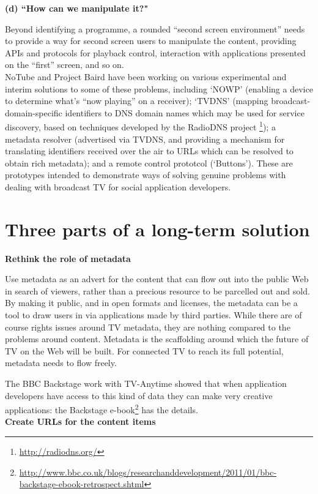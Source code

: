 \documentclass[]{article}%
\begin{document}
{\bf{(d) ``How can we manipulate it?"}}

Beyond identifying a programme, a rounded ``second screen environment'' needs to provide a way for second screen users to manipulate the content, providing APIs and protocols for playback control, interaction with applications presented on the ``first'' screen, and so on.
\\

NoTube and Project Baird have been working on various experimental and interim solutions to some of these problems, including  `NOWP' (enabling a device to determine what's ``now playing'' on a receiver);  `TVDNS' (mapping broadcast-domain-specific identifiers to DNS domain names which may be used for service discovery, based on techniques developed by the RadioDNS project \footnote{\url{http://radiodns.org/}}); a metadata resolver (advertised via TVDNS, and providing a mechanism for translating identifiers received over the air to URLs which can be resolved to obtain rich metadata); and a remote control prototcol (`Buttons'). These are prototypes intended to demonstrate ways of solving genuine problems with dealing with broadcast TV for social application developers. 

\section{Three parts of a long-term solution}

{\bf{Rethink the role of metadata}}

Use metadata as an advert for the content that can flow out into the public Web in search of viewers, rather than a precious resource to be parcelled out and sold. By making it public, and in open formats and licenses, the metadata can be a tool to draw users in via applications made by third parties. While there are of course rights issues around TV metadata, they are nothing compared to the problems around content. Metadata is the scaffolding around which the future of TV on the Web will be built. For connected TV to reach its full potential, metadata needs to flow freely.

The BBC Backstage work with TV-Anytime showed that when application developers have access to this kind of data they can make very creative applications: the Backstage e-book\footnote{\url{http://www.bbc.co.uk/blogs/researchanddevelopment/2011/01/bbc-backstage-ebook-retrospect.shtml}} has the details. 
\\

{\bf{Create URLs for the content items}}
\end{document}
